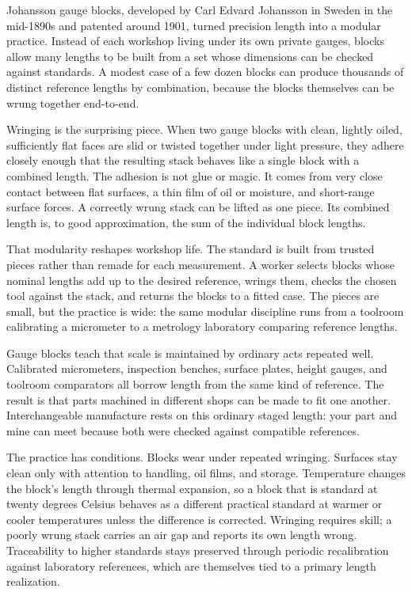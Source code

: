 Johansson gauge blocks, developed by Carl Edvard Johansson in Sweden in the
mid-1890s and patented around 1901, turned precision length into a modular
practice. Instead of each workshop living under its own private gauges,
blocks allow many lengths to be built from a set whose dimensions can be
checked against standards. A modest case of a few dozen blocks can produce
thousands of distinct reference lengths by combination, because the blocks
themselves can be wrung together end-to-end.

Wringing is the surprising piece. When two gauge blocks with clean, lightly
oiled, sufficiently flat faces are slid or twisted together under light
pressure, they adhere closely enough that the resulting stack behaves like
a single block with a combined length. The adhesion is not glue or magic.
It comes from very close contact between flat surfaces, a thin film of oil
or moisture, and short-range surface forces. A correctly wrung stack can
be lifted as one piece. Its combined length is, to good approximation,
the sum of the individual block lengths.

That modularity reshapes workshop life. The standard is built from trusted
pieces rather than remade for each measurement. A worker selects blocks
whose nominal lengths add up to the desired reference, wrings them, checks
the chosen tool against the stack, and returns the blocks to a fitted
case. The pieces are small, but the practice is wide: the same modular
discipline runs from a toolroom calibrating a micrometer to a metrology
laboratory comparing reference lengths.

Gauge blocks teach that scale is maintained by ordinary acts repeated
well. Calibrated micrometers, inspection benches, surface plates, height
gauges, and toolroom comparators all borrow length from the same kind of
reference. The result is that parts machined in different shops can be
made to fit one another. Interchangeable manufacture rests on this
ordinary staged length: your part and mine can meet because both were
checked against compatible references.

The practice has conditions. Blocks wear under repeated wringing. Surfaces
stay clean only with attention to handling, oil films, and storage.
Temperature changes the block's length through thermal expansion, so a
block that is standard at twenty degrees Celsius behaves as a different
practical standard at warmer or cooler temperatures unless the difference
is corrected. Wringing requires skill; a poorly wrung stack carries an air
gap and reports its own length wrong. Traceability to higher standards
stays preserved through periodic recalibration against laboratory
references, which are themselves tied to a primary length realization.

